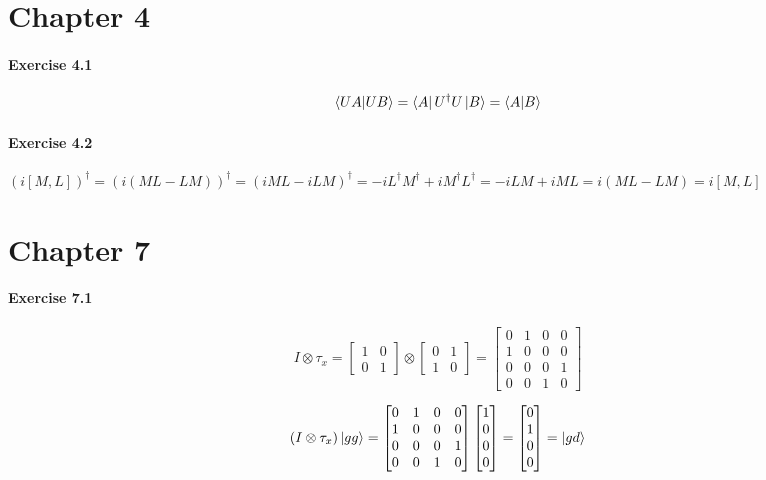 \documentclass[a4paper]{article}
\begin{document}
\section{Chapter 4}

\paragraph{Exercise 4.1}

$$
    \bra{U A}\ket{U B} = \bra{A} U^{\dag} U \ket{B} = \bra{A}\ket{B}
$$

\paragraph{Exercise 4.2}

\begin{math}
    (i [M, L])^{\dag} = (i (M L - L M))^{\dag} = (i M L - i L M)^{\dag} = - i L^{\dag} M^{\dag} + i M^{\dag} L^{\dag} =
    - i L M + i M L = i (M L - L M) = i [M, L]
\end{math}

\section{Chapter 7}

\paragraph{Exercise 7.1}

$$
    I \otimes \tau_{x} =
    \begin{bmatrix}
        1 & 0 \\
        0 & 1
    \end{bmatrix}
    \otimes
    \begin{bmatrix}
        0 & 1 \\
        1 & 0
    \end{bmatrix} =
    \begin{bmatrix}
        0 & 1 & 0 & 0 \\
        1 & 0 & 0 & 0 \\
        0 & 0 & 0 & 1 \\
        0 & 0 & 1 & 0
    \end{bmatrix}
$$

$$
    (I \otimes \tau_{x})\ket{gg} =
    \begin{bmatrix}
        0 & 1 & 0 & 0 \\
        1 & 0 & 0 & 0 \\
        0 & 0 & 0 & 1 \\
        0 & 0 & 1 & 0
    \end{bmatrix}
    \begin{bmatrix}
        1 \\
        0 \\
        0 \\
        0
    \end{bmatrix} =
    \begin{bmatrix}
        0 \\
        1 \\
        0 \\
        0
    \end{bmatrix} =
    \ket{gd}
$$
\end{document}
